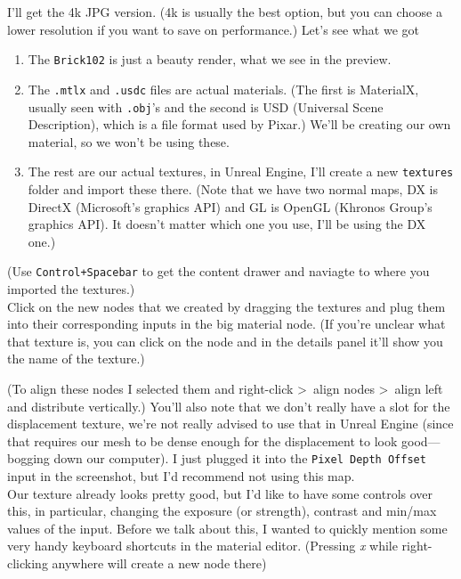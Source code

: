 \documentclass{article}
\begin{document}
I'll get the 4k JPG version. (4k is usually the best option, but you can choose a lower resolution if you want to save on performance.)
\newpage
Let's see what we got

\begin{enumerate}
    \item The \verb|Brick102| is just a beauty render, what we see in the preview.
    \item The \verb|.mtlx| and \verb|.usdc| files are actual materials. (The first is MaterialX, usually seen with \verb|.obj|'s and the second is USD (Universal Scene Description), which is a file format used by Pixar.) We'll be creating our own material, so we won't be using these.
    \item The rest are our actual textures, in Unreal Engine, I'll create a new \verb|textures| folder and import these there. (Note that we have two normal maps, DX is DirectX (Microsoft's graphics API) and GL is OpenGL (Khronos Group's graphics API). It doesn't matter which one you use, I'll be using the DX one.)
\end{enumerate}

(Use \verb|Control+Spacebar| to get the content drawer and naviagte to where you imported the textures.)
\\[10pt]
Click on the new nodes that we created by dragging the textures and plug them into their corresponding inputs in the big material node. (If you're unclear what that texture is, you can click on the node and in the details panel it'll show you the name of the texture.)

(To align these nodes I selected them and right-click \textgreater\, align nodes \textgreater\, align left and distribute vertically.)
You'll also note that we don't really have a slot for the displacement texture, we're not really advised to use that in Unreal Engine (since that requires our mesh to be dense enough for the displacement to look good---bogging down our computer). I just plugged it into the \verb|Pixel Depth Offset| input in the screenshot, but I'd recommend not using this map.
\\[10pt]
Our texture already looks pretty good, but I'd like to have some controls over this, in particular, changing the exposure (or strength), contrast and min/max values of the input. Before we talk about this, I wanted to quickly mention some very handy keyboard shortcuts in the material editor. (Pressing \emph{x} while right-clicking anywhere will create a new node there)
\end{document}

